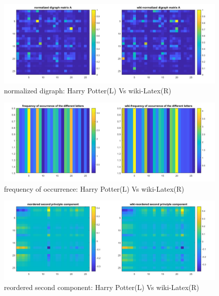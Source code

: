 \documentclass[a4paper]{article}
\begin{document}
\begin{figure}[H] 
\centering 
\includegraphics[width=1.0\textwidth]{2.3-1.png}
\caption{normalized digraph: Harry Potter(L) Vs wiki-Latex(R)} 
\label{Fig.2.3-1} 
\end{figure}

\begin{figure}[H] 
\centering 
\includegraphics[width=1.0\textwidth]{2.3-2.png}
\caption{frequency of occurrence: Harry Potter(L) Vs wiki-Latex(R)} 
\label{Fig.2.3-2} 
\end{figure}

\begin{figure}[H] 
\centering 
\includegraphics[width=1.0\textwidth]{2.3-3.png}
\caption{reordered second component: Harry Potter(L) Vs wiki-Latex(R)} 
\label{Fig.2.3-3} 
\end{figure}
\end{document}
